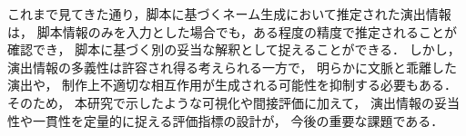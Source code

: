 \documentclass[a4j,12pt,dvipdfmx]{jsreport}
\begin{document}
これまで見てきた通り，脚本に基づくネーム生成において推定された演出情報は，
脚本情報のみを入力とした場合でも，ある程度の精度で推定されることが確認でき，
脚本に基づく別の妥当な解釈として捉えることができる．
しかし，
演出情報の多義性は許容され得る考えられる一方で，
明らかに文脈と乖離した演出や，
制作上不適切な相互作用が生成される可能性を抑制する必要もある．
そのため，
本研究で示したような可視化や間接評価に加えて，
演出情報の妥当性や一貫性を定量的に捉える評価指標の設計が，
今後の重要な課題である．

\ifdefined\ismain\else
   \printbibliography[title=参考文献]
\fi
\end{document}
